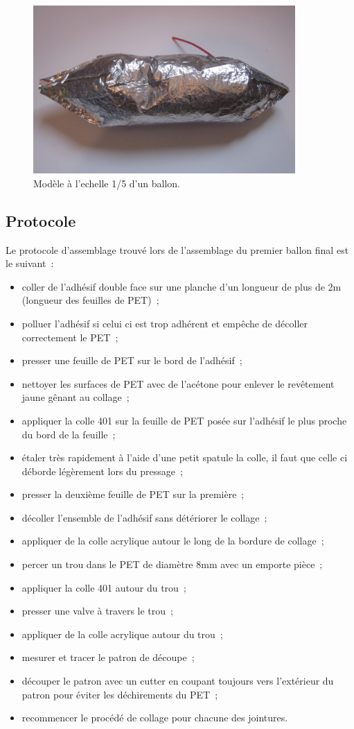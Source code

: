 \documentclass[a4paper,11pt]{article}
\begin{document}
\begin{figure}[H]
 \centering
 \includegraphics[width=10cm]{../Images/ballon4.JPG}
 \caption{Modèle à l'echelle 1/5 d'un ballon.}
\end{figure}

\subsection{Protocole}

Le protocole d'assemblage trouvé lors de l'assemblage du premier ballon final est le suivant~:
\begin{itemize}
 \item coller de l'adhésif double face sur une planche d'un longueur de plus de 2m (longueur des feuilles de PET)~;
 \item polluer l'adhésif si celui ci est trop adhérent et empêche de décoller correctement le PET~;
 \item presser une feuille de PET sur le bord de l'adhésif~;
 \item nettoyer les surfaces de PET avec de l'acétone pour enlever le revêtement jaune gênant au collage~;
 \item appliquer la colle 401 sur la feuille de PET posée sur l'adhésif le plus proche du bord de la feuille~;
 \item étaler très rapidement à l'aide d'une petit spatule la colle, il faut que celle ci déborde légèrement lors du pressage~;
 \item presser la deuxième feuille de PET sur la première~;
 \item décoller l'ensemble de l'adhésif sans détériorer le collage~;
 \item appliquer de la colle acrylique autour le long de la bordure de collage~;
 \item percer un trou dans le PET de diamètre 8mm avec un emporte pièce~;
 \item appliquer la colle 401 autour du trou~;
 \item presser une valve à travers le trou~;
 \item appliquer de la colle acrylique autour du trou~;
 \item mesurer et tracer le patron de découpe~;
 \item découper le patron avec un cutter en coupant toujours vers l'extérieur du patron pour éviter les déchirements du PET~;
 \item recommencer le procédé de collage pour chacune des jointures.
\end{itemize}
\end{document}
